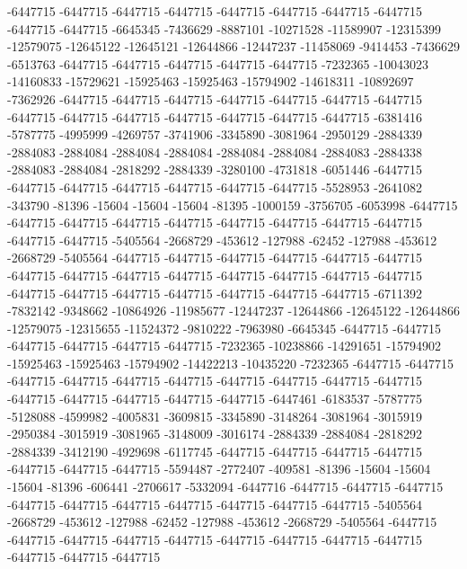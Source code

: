 -6447715 -6447715 -6447715 -6447715 -6447715 -6447715 -6447715 -6447715 -6447715 -6447715 -6645345 -7436629 -8887101 -10271528 -11589907 -12315399 -12579075 -12645122 -12645121 -12644866 -12447237 -11458069 -9414453 -7436629 -6513763 -6447715 -6447715 -6447715 -6447715 -6447715 -7232365 -10043023 -14160833 -15729621 -15925463 -15925463 -15794902 -14618311 -10892697 -7362926 -6447715 -6447715 -6447715 -6447715 -6447715 -6447715 -6447715 -6447715 -6447715 -6447715 -6447715 -6447715 -6447715 -6447715 -6381416 -5787775 -4995999 -4269757 -3741906 -3345890 -3081964 -2950129 -2884339 -2884083 -2884084 -2884084 -2884084 -2884084 -2884084 -2884083 -2884338 -2884083 -2884084 -2818292 -2884339 -3280100 -4731818 -6051446 -6447715 -6447715 -6447715 -6447715 -6447715 -6447715 -6447715 -5528953 -2641082 -343790 -81396 -15604 -15604 -15604 -81395 -1000159 -3756705 -6053998 -6447715 -6447715 -6447715 -6447715 -6447715 -6447715 -6447715 -6447715 -6447715 -6447715 -6447715 -5405564 -2668729 -453612 -127988 -62452 -127988 -453612 -2668729 -5405564 -6447715 -6447715 -6447715 -6447715 -6447715 -6447715 -6447715 -6447715 -6447715 -6447715 -6447715 -6447715
-6447715 -6447715 -6447715 -6447715 -6447715 -6447715 -6447715 -6447715 -6447715 -6711392 -7832142 -9348662 -10864926 -11985677 -12447237 -12644866 -12645122 -12644866 -12579075 -12315655 -11524372 -9810222 -7963980 -6645345 -6447715 -6447715 -6447715 -6447715 -6447715 -6447715 -7232365 -10238866 -14291651 -15794902 -15925463 -15925463 -15794902 -14422213 -10435220 -7232365 -6447715 -6447715 -6447715 -6447715 -6447715 -6447715 -6447715 -6447715 -6447715 -6447715 -6447715 -6447715 -6447715 -6447715 -6447715 -6447461 -6183537 -5787775 -5128088 -4599982 -4005831 -3609815 -3345890 -3148264 -3081964 -3015919 -2950384 -3015919 -3081965 -3148009 -3016174 -2884339 -2884084 -2818292 -2884339 -3412190 -4929698 -6117745 -6447715 -6447715 -6447715 -6447715 -6447715 -6447715 -6447715 -5594487 -2772407 -409581 -81396 -15604 -15604 -15604 -81396 -606441 -2706617 -5332094 -6447716 -6447715 -6447715 -6447715 -6447715 -6447715 -6447715 -6447715 -6447715 -6447715 -6447715 -5405564 -2668729 -453612 -127988 -62452 -127988 -453612 -2668729 -5405564 -6447715 -6447715 -6447715 -6447715 -6447715 -6447715 -6447715 -6447715 -6447715 -6447715 -6447715 -6447715
